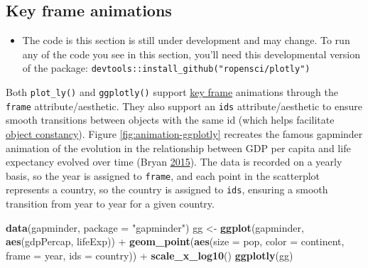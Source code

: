 \documentclass[12pt,]{isuthesis}
\newenvironment{Shaded}{\begin{snugshade}}{\end{snugshade}}
\newcommand{\KeywordTok}[1]{\textcolor[rgb]{0.13,0.29,0.53}{\textbf{{#1}}}}
\newcommand{\DataTypeTok}[1]{\textcolor[rgb]{0.13,0.29,0.53}{{#1}}}
\newcommand{\StringTok}[1]{\textcolor[rgb]{0.31,0.60,0.02}{{#1}}}
\newcommand{\NormalTok}[1]{{#1}}
\newenvironment{rmdblock}[1]
  {\begin{shaded*}
  \begin{itemize}
  \renewcommand{\labelitemi}{
    \raisebox{-.7\height}[0pt][0pt]{
      {\setkeys{Gin}{width=3em,keepaspectratio}\texttt{[image: images/\#1]}}
    }
  }
  \item
  }
  {
  \end{itemize}
  \end{shaded*}
  }
\newenvironment{rmdwarning}
  {\begin{rmdblock}{warning}}
  {\end{rmdblock}}
\begin{document}
\subsection{Key frame animations}\label{key-frame-animations}

\begin{rmdwarning}
The code is this section is still under development and may change. To
run any of the code you see in this section, you'll need this
developmental version of the package:
\texttt{devtools::install\_github("ropensci/plotly")}
\end{rmdwarning}

Both \texttt{plot\_ly()} and \texttt{ggplotly()} support
\href{https://en.wikipedia.org/wiki/Key_frame}{key frame} animations
through the \texttt{frame} attribute/aesthetic. They also support an
\texttt{ids} attribute/aesthetic to ensure smooth transitions between
objects with the same id (which helps facilitate
\href{https://bost.ocks.org/mike/constancy/}{object constancy}). Figure
\ref{fig:animation-ggplotly} recreates the famous gapminder animation of
the evolution in the relationship between GDP per capita and life
expectancy evolved over time (Bryan
\protect\hyperlink{ref-gapminder}{2015}). The data is recorded on a
yearly basis, so the year is assigned to \texttt{frame}, and each point
in the scatterplot represents a country, so the country is assigned to
\texttt{ids}, ensuring a smooth transition from year to year for a given
country.

\begin{Shaded}
\begin{Highlighting}[]
\KeywordTok{data}\NormalTok{(gapminder, }\DataTypeTok{package =} \StringTok{"gapminder"}\NormalTok{)}
\NormalTok{gg <-}\StringTok{ }\KeywordTok{ggplot}\NormalTok{(gapminder, }\KeywordTok{aes}\NormalTok{(gdpPercap, lifeExp)) +}
\StringTok{  }\KeywordTok{geom_point}\NormalTok{(}\KeywordTok{aes}\NormalTok{(}\DataTypeTok{size =} \NormalTok{pop, }\DataTypeTok{color =} \NormalTok{continent, }\DataTypeTok{frame =} \NormalTok{year, }\DataTypeTok{ids =} \NormalTok{country)) +}
\StringTok{  }\KeywordTok{scale_x_log10}\NormalTok{()}
\KeywordTok{ggplotly}\NormalTok{(gg)}
\end{Highlighting}
\end{Shaded}
\end{document}
